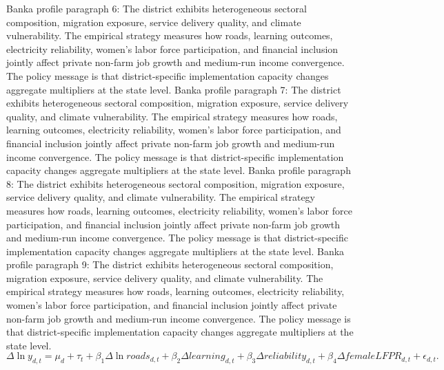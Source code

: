 \documentclass[preprint,12pt]{elsarticle}
\begin{document}
Banka profile paragraph 6: The district exhibits heterogeneous sectoral composition, migration exposure, service delivery quality, and climate vulnerability. The empirical strategy measures how roads, learning outcomes, electricity reliability, women's labor force participation, and financial inclusion jointly affect private non-farm job growth and medium-run income convergence. The policy message is that district-specific implementation capacity changes aggregate multipliers at the state level.
Banka profile paragraph 7: The district exhibits heterogeneous sectoral composition, migration exposure, service delivery quality, and climate vulnerability. The empirical strategy measures how roads, learning outcomes, electricity reliability, women's labor force participation, and financial inclusion jointly affect private non-farm job growth and medium-run income convergence. The policy message is that district-specific implementation capacity changes aggregate multipliers at the state level.
Banka profile paragraph 8: The district exhibits heterogeneous sectoral composition, migration exposure, service delivery quality, and climate vulnerability. The empirical strategy measures how roads, learning outcomes, electricity reliability, women's labor force participation, and financial inclusion jointly affect private non-farm job growth and medium-run income convergence. The policy message is that district-specific implementation capacity changes aggregate multipliers at the state level.
Banka profile paragraph 9: The district exhibits heterogeneous sectoral composition, migration exposure, service delivery quality, and climate vulnerability. The empirical strategy measures how roads, learning outcomes, electricity reliability, women's labor force participation, and financial inclusion jointly affect private non-farm job growth and medium-run income convergence. The policy message is that district-specific implementation capacity changes aggregate multipliers at the state level.
\begin{equation}\Delta \ln y_{d,t}=\mu_d+\tau_t+\beta_1\Delta\ln roads_{d,t}+\beta_2\Delta learning_{d,t}+\beta_3\Delta reliability_{d,t}+\beta_4\Delta femaleLFPR_{d,t}+\epsilon_{d,t}.\end{equation}
\end{document}
